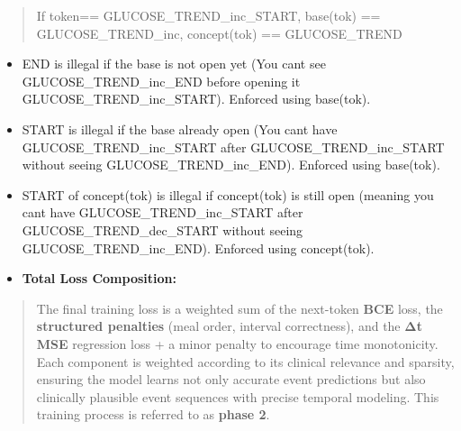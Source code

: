 \documentclass[
]{article}
\begin{document}
\begin{quote}
If token== \textquotesingle GLUCOSE\_TREND\_inc\_START\textquotesingle,
base(tok) == \textquotesingle GLUCOSE\_TREND\_inc\textquotesingle,
concept(tok) == \textquotesingle GLUCOSE\_TREND\textquotesingle{}
\end{quote}

\begin{itemize}
\item
  END is illegal if the base is not open yet (You can\textquotesingle t
  see \textquotesingle GLUCOSE\_TREND\_inc\_END\textquotesingle{} before
  opening it
  \textquotesingle GLUCOSE\_TREND\_inc\_START\textquotesingle). Enforced
  using base(tok).
\item
  START is illegal if the base already open (You can\textquotesingle t
  have \textquotesingle GLUCOSE\_TREND\_inc\_START\textquotesingle{}
  after \textquotesingle GLUCOSE\_TREND\_inc\_START\textquotesingle{}
  without seeing
  \textquotesingle GLUCOSE\_TREND\_inc\_END\textquotesingle). Enforced
  using base(tok).
\item
  START of concept(tok) is illegal if concept(tok) is still open
  (meaning you can\textquotesingle t have
  \textquotesingle GLUCOSE\_TREND\_inc\_START\textquotesingle{} after
  \textquotesingle GLUCOSE\_TREND\_dec\_START\textquotesingle{} without
  seeing \textquotesingle GLUCOSE\_TREND\_inc\_END\textquotesingle).
  Enforced using concept(tok).
\end{itemize}

\begin{itemize}
\item
  \textbf{Total Loss Composition:}
\end{itemize}

\begin{quote}
The final training loss is a weighted sum of the next-token \textbf{BCE}
loss, the \textbf{structured penalties} (meal order, interval
correctness), and the \textbf{Δt MSE} regression loss + a minor penalty
to encourage time monotonicity. Each component is weighted according to
its clinical relevance and sparsity, ensuring the model learns not only
accurate event predictions but also clinically plausible event sequences
with precise temporal modeling. This training process is referred to as
\textbf{phase 2}.
\end{quote}
\end{document}
